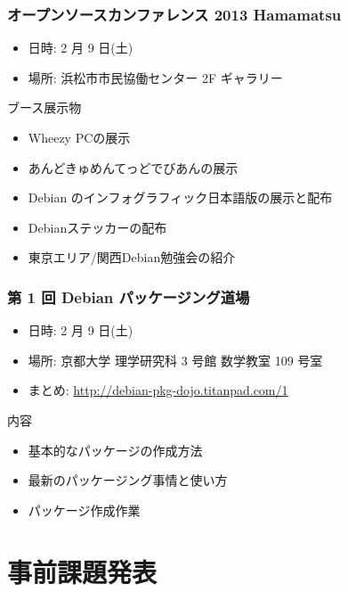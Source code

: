 \documentclass[cjk,dvipdfmx,10pt,compress,%
hyperref={bookmarks=true,bookmarksnumbered=true,bookmarksopen=false,%
colorlinks=false,%
pdftitle={第 69 回 関西 Debian 勉強会},%
pdfauthor={倉敷・のがた・佐々木・かわだ},%
pdfsubject={資料},%
}]{beamer}
\begin{document}
\begin{frame}[fragile]
  \frametitle{オープンソースカンファレンス 2013 Hamamatsu}
  \begin{itemize}
  \item 日時: 2 月 9 日(土)
  \item 場所: 浜松市市民協働センター 2F ギャラリー
  \end{itemize}
  \begin{block}{ブース展示物}
    \begin{itemize}
    \item Wheezy PCの展示
    \item あんどきゅめんてっどでびあんの展示
    \item Debian のインフォグラフィック日本語版の展示と配布
    \item Debianステッカーの配布
    \item 東京エリア/関西Debian勉強会の紹介
    \end{itemize}
  \end{block}
\end{frame}

\begin{frame}[fragile]
  \frametitle{第 1 回 Debian パッケージング道場}
  \begin{itemize}
  \item 日時: 2 月 9 日(土)
  \item 場所: 京都大学 理学研究科 3 号館 数学教室 109 号室
  \item まとめ: \url{http://debian-pkg-dojo.titanpad.com/1}
  \end{itemize}
  \begin{block}{内容}
    \begin{itemize}
    \item 基本的なパッケージの作成方法
    \item 最新のパッケージング事情と使い方
    \item パッケージ作成作業
    \end{itemize}
  \end{block}
\end{frame}


\section{事前課題発表}

\end{document}
